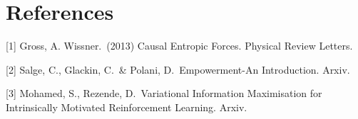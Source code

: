 \documentclass{article}
\begin{document}
\section*{References}

\small

[1] Gross, A. Wissner.\ (2013) Causal Entropic Forces. Physical Review Letters.

[2] Salge, C., Glackin, C.\ \& Polani, D.\ Empowerment-An Introduction. Arxiv. 

[3] Mohamed, S., Rezende, D.\ Variational Information Maximisation for Intrinsically Motivated Reinforcement Learning. Arxiv. 
\end{document}
